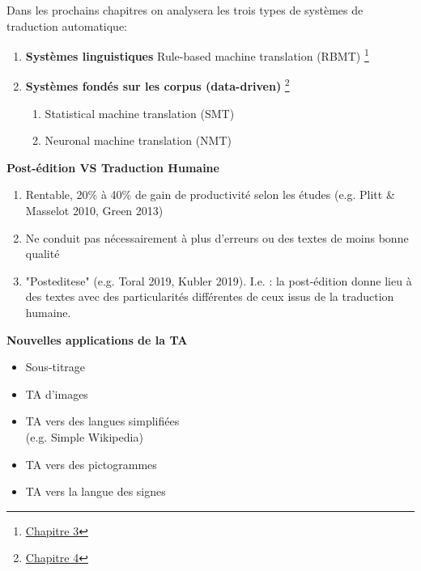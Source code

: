 \noindent Dans les prochains chapitres on analysera les trois types de systèmes de traduction automatique:

\begin{enumerate}
    \item \textbf{Systèmes linguistiques} Rule-based machine translation (RBMT) \footnote{\hyperref[sec:RBMT]{Chapitre 3}}
    \item \textbf{Systèmes fondés sur les corpus (data-driven)} \footnote{\hyperref[sec:corpus]{Chapitre 4}}
    \begin{enumerate}
        \item Statistical machine translation (SMT)
        \item Neuronal machine translation (NMT) \\
    \end{enumerate}
\end{enumerate}

\noindent\textbf{Post-édition VS Traduction Humaine}
\begin{enumerate}
    \item Rentable, 20\% à 40\% de gain de productivité selon les études (e.g. Plitt \& Masselot 2010, Green 2013)
    \item Ne conduit pas nécessairement à plus d'erreurs ou des textes de moins bonne qualité
    \item "Posteditese" (e.g. Toral 2019, Kubler 2019). I.e. : la post-édition donne lieu à des textes avec des particularités différentes de ceux issus de la traduction humaine.
\end{enumerate}

\newpage

\noindent\textbf{Nouvelles applications de la TA\\}

\begin{minipage}[t]{0.5\textwidth}
\begin{itemize}
\item Sous-titrage
\item TA d'images
\item TA vers des langues simplifiées \\(e.g. Simple Wikipedia)\\
\end{itemize}
\end{minipage}
\begin{minipage}[t]{0.5\textwidth}
\begin{itemize}
\item TA vers des pictogrammes
\item TA vers la langue des signes
\end{itemize}
\end{minipage}


